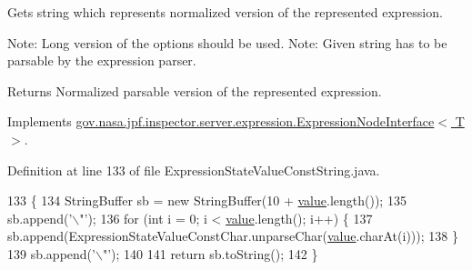Gets string which represents normalized version of the represented expression. 

Note\+: Long version of the options should be used. Note\+: Given string has to be parsable by the expression parser.

\begin{DoxyReturn}{Returns}
Normalized parsable version of the represented expression. 
\end{DoxyReturn}


Implements \hyperlink{interfacegov_1_1nasa_1_1jpf_1_1inspector_1_1server_1_1expression_1_1_expression_node_interface_ae5387d8da0126c1256a786d54b9bd7ce}{gov.\+nasa.\+jpf.\+inspector.\+server.\+expression.\+Expression\+Node\+Interface$<$ T $>$}.



Definition at line 133 of file Expression\+State\+Value\+Const\+String.\+java.


\begin{DoxyCode}
133                                            \{
134     StringBuffer sb = \textcolor{keyword}{new} StringBuffer(10 + \hyperlink{classgov_1_1nasa_1_1jpf_1_1inspector_1_1server_1_1expression_1_1expressions_1_1_expression_state_value_const_string_ac4c2de5d71c2fa57cb8029d1fde8e437}{value}.length());
135     sb.append(\textcolor{charliteral}{'\(\backslash\)"'});
136     \textcolor{keywordflow}{for} (\textcolor{keywordtype}{int} i = 0; i < \hyperlink{classgov_1_1nasa_1_1jpf_1_1inspector_1_1server_1_1expression_1_1expressions_1_1_expression_state_value_const_string_ac4c2de5d71c2fa57cb8029d1fde8e437}{value}.length(); i++) \{
137       sb.append(ExpressionStateValueConstChar.unparseChar(\hyperlink{classgov_1_1nasa_1_1jpf_1_1inspector_1_1server_1_1expression_1_1expressions_1_1_expression_state_value_const_string_ac4c2de5d71c2fa57cb8029d1fde8e437}{value}.charAt(i)));
138     \}
139     sb.append(\textcolor{charliteral}{'\(\backslash\)"'});
140 
141     \textcolor{keywordflow}{return} sb.toString();
142   \}
\end{DoxyCode}
